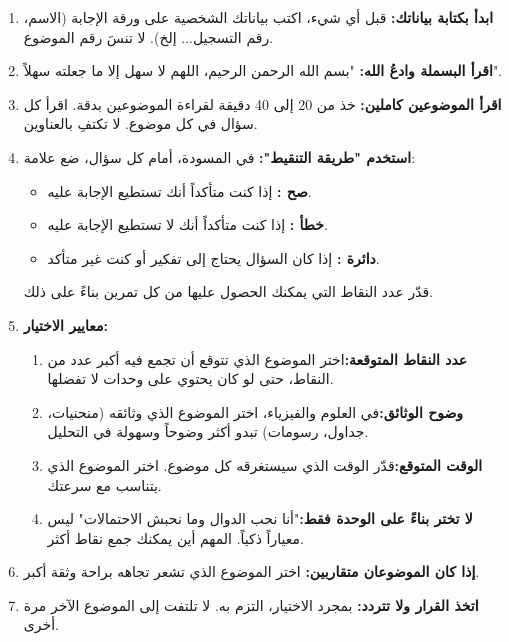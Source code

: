 \documentclass[12pt,a4paper]{book}
\begin{document}
	\begin{enumerate}
		\item \textbf{ابدأ بكتابة بياناتك:} قبل أي شيء، اكتب بياناتك الشخصية على ورقة الإجابة (الاسم، رقم التسجيل... إلخ). لا تنسَ رقم الموضوع.
		\item \textbf{اقرأ البسملة وادعُ الله:} "بسم الله الرحمن الرحيم، اللهم لا سهل إلا ما جعلته سهلاً".
		\item \textbf{اقرأ الموضوعين كاملين:} خذ من 20 إلى 40 دقيقة لقراءة الموضوعين بدقة. اقرأ كل سؤال في كل موضوع. لا تكتفِ بالعناوين.
		\item \textbf{استخدم "طريقة التنقيط":} في المسودة، أمام كل سؤال، ضع علامة:
		\begin{itemize}
			\item \textbf{صح :} إذا كنت متأكداً أنك تستطيع الإجابة عليه.
			\item \textbf{خطأ :} إذا كنت متأكداً أنك لا تستطيع الإجابة عليه.
			\item \textbf{دائرة :} إذا كان السؤال يحتاج إلى تفكير أو كنت غير متأكد.
		\end{itemize}
		قدّر عدد النقاط التي يمكنك الحصول عليها من كل تمرين بناءً على ذلك.
		\item \textbf{معايير الاختيار:}
		\begin{enumerate}
			\item \textbf{عدد النقاط المتوقعة:}\newline اختر الموضوع الذي تتوقع أن تجمع فيه أكبر عدد من النقاط، حتى لو كان يحتوي على وحدات لا تفضلها.
			\item \textbf{وضوح الوثائق:}\newline في العلوم والفيزياء، اختر الموضوع الذي وثائقه (منحنيات، جداول، رسومات) تبدو أكثر وضوحاً وسهولة في التحليل.
			\item \textbf{الوقت المتوقع:}\newline قدّر الوقت الذي سيستغرقه كل موضوع. اختر الموضوع الذي يتناسب مع سرعتك.
			\item \textbf{لا تختر بناءً على الوحدة فقط:}\newline "أنا نحب الدوال وما نحبش الاحتمالات" ليس معياراً ذكياً. المهم أين يمكنك جمع نقاط أكثر.
		\end{enumerate}
		\item \textbf{إذا كان الموضوعان متقاربين:} اختر الموضوع الذي تشعر تجاهه براحة وثقة أكبر.
		\item \textbf{اتخذ القرار ولا تتردد:} بمجرد الاختيار، التزم به. لا تلتفت إلى الموضوع الآخر مرة أخرى.
	\end{enumerate}
	
\end{document}
